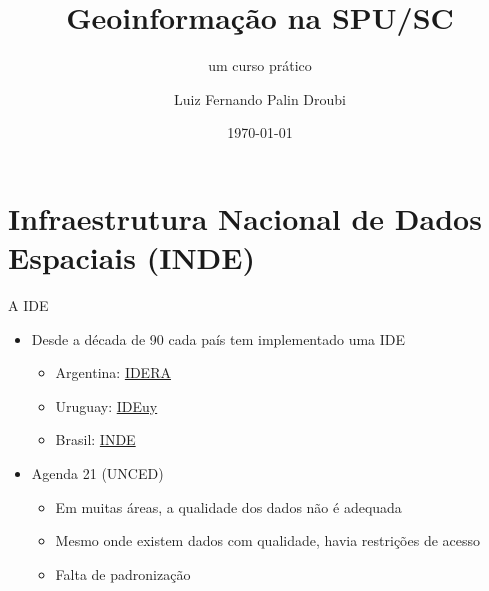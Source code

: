 \documentclass[9pt,ignorenonframetext,]{beamer}
\title[]{Geoinformação na SPU/SC}
\subtitle{um curso prático}
\author[
        Luiz Fernando Palin Droubi
    ]{Luiz Fernando Palin Droubi}
\institute[
    ]{
    Superintendência do Patrimônio da União em Santa Catarina
    }
\date[
      \today
  ]{
      \today
        }
\providecommand{\tightlist}{%
  \setlength{\itemsep}{0pt}\setlength{\parskip}{0pt}}
\begin{document}
  \begin{frame}[plain]
  \titlepage
  \end{frame}


  \begin{frame}
  \tableofcontents[hideallsubsections]
  \end{frame}

\hypertarget{infraestrutura-nacional-de-dados-espaciais-inde}{%
\section{Infraestrutura Nacional de Dados Espaciais
(INDE)}\label{infraestrutura-nacional-de-dados-espaciais-inde}}

\begin{frame}{A IDE}
\protect\hypertarget{a-ide}{}

\begin{itemize}[<+->]
\tightlist
\item
  Desde a década de 90 cada país tem implementado uma IDE

  \begin{itemize}[<+->]
  \tightlist
  \item
    Argentina: \href{https://www.idera.gob.ar/}{IDERA}
  \item
    Uruguay:
    \href{https://www.gub.uy/infraestructura-datos-espaciales/}{IDEuy}
  \item
    Brasil: \href{https://www.inde.gov.br/}{INDE}
  \end{itemize}
\item
  Agenda 21 (UNCED)

  \begin{itemize}[<+->]
  \tightlist
  \item
    Em muitas áreas, a qualidade dos dados não é adequada
  \item
    Mesmo onde existem dados com qualidade, havia restrições de acesso
  \item
    Falta de padronização
  \end{itemize}
\end{itemize}

\end{frame}
\end{document}
